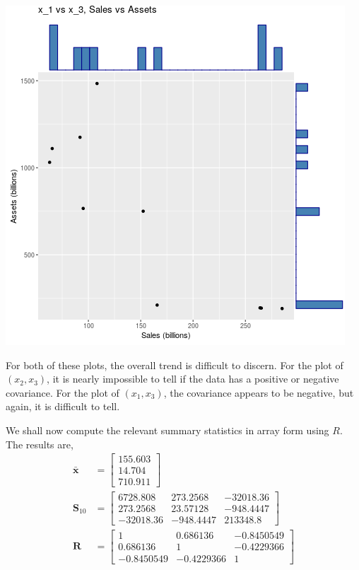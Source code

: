 \documentclass[letterpaper,10pt]{article}
\begin{document}
\begin{description}
\begin{center}
\includegraphics[scale=0.75]{1513scatter.png}
\end{center}
For both of these plots, the overall trend is difficult to discern. For the plot of $(x_2,x_3)$, it is nearly impossible to tell if the data has a positive or negative covariance. For the plot of $(x_1,x_3)$, the covariance appears to be negative, but again, it is difficult to tell.
\item We shall now compute the relevant summary statistics in array form using $R$. The results are,
\begin{align*}
\bar{\textbf{x}} &= \begin{bmatrix}
155.603\\14.704\\710.911
\end{bmatrix}\\
\textbf{S}_{10} &= \begin{bmatrix}
6728.808 & 273.2568 & -32018.36\\
273.2568 & 23.57128 & -948.4447\\
-32018.36 & -948.4447 & 213348.8
\end{bmatrix} \\
\textbf{R} &= \begin{bmatrix}
1 & 0.686136 & -0.8450549\\
0.686136 & 1 & -0.4229366\\
-0.8450549 & -0.4229366 & 1

\end{bmatrix}
\end{align*}
\end{description}
\end{document}
